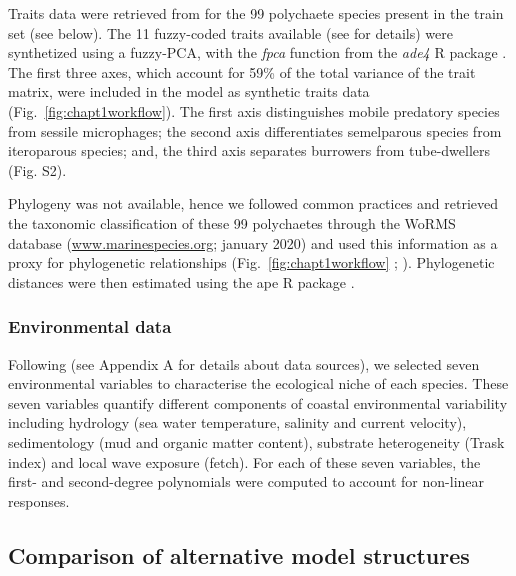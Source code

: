 \begin{refsection}
Traits data were retrieved from \autocite{Boye_2019a} for the 99
polychaete species present in the train set (see below). The 11
fuzzy-coded traits available (see \textcite{Boye_2019a} for details)
were synthetized using a fuzzy-PCA, with the \emph{fpca} function from
the \emph{ade4} R package \autocite{Thioulouse_2018}. The first three
axes, which account for 59\% of the total variance of the trait matrix,
were included in the model as synthetic traits data
(Fig.~\ref{fig:chapt1workflow}). The first axis distinguishes mobile
predatory species from sessile microphages; the second axis
differentiates semelparous species from iteroparous species; and, the
third axis separates burrowers from tube-dwellers (Fig. S2).

Phylogeny was not available, hence we followed common practices
\autocite{Ovaskainen_2020} and retrieved the taxonomic classification of
these 99 polychaetes through the WoRMS database
(\href{https://www.marinespecies.org}{www.marinespecies.org}; january
2020) and used this information as a proxy for phylogenetic
relationships (Fig.~\ref{fig:chapt1workflow} ;
\textcite{Ovaskainen_2020}). Phylogenetic distances were then estimated
using the ape R package \autocite{Paradis_2019}.

\hypertarget{environmental-data}{%
\subsubsection{Environmental data}\label{environmental-data}}

Following \textcite{Boye_2019a} (see Appendix A for details about data
sources), we selected seven environmental variables to characterise the
ecological niche of each species. These seven variables quantify
different components of coastal environmental variability including
hydrology (sea water temperature, salinity and current velocity),
sedimentology (mud and organic matter content), substrate heterogeneity
(Trask index) and local wave exposure (fetch). For each of these seven
variables, the first- and second-degree polynomials were computed to
account for non-linear responses.

\hypertarget{comparison-of-alternative-model-structures}{%
\subsection{Comparison of alternative model
structures}\label{comparison-of-alternative-model-structures}}


\end{refsection}
